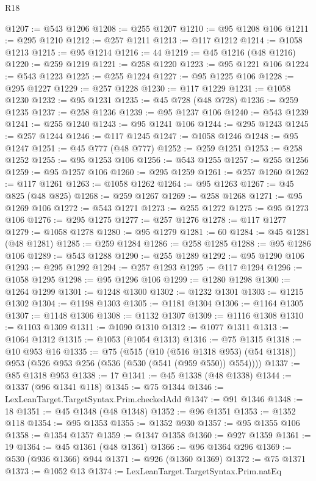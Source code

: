 \begin{lexlean}{R18}
\begin{coremodule}
@1207 := @543 @1206
@1208 := @255 @1207
@1210 := @95 @1208 @106
@1211 := @295 @1210
@1212 := @257 @1211
@1213 := @117 @1212
@1214 := @1058 @1213
@1215 := @95 @1214
@1216 := 44
@1219 := @45 @1216 (@48 @1216)
@1220 := @259 @1219
@1221 := @258 @1220
@1223 := @95 @1221 @106
@1224 := @543 @1223
@1225 := @255 @1224
@1227 := @95 @1225 @106
@1228 := @295 @1227
@1229 := @257 @1228
@1230 := @117 @1229
@1231 := @1058 @1230
@1232 := @95 @1231
@1235 := @45 @728 (@48 @728)
@1236 := @259 @1235
@1237 := @258 @1236
@1239 := @95 @1237 @106
@1240 := @543 @1239
@1241 := @255 @1240
@1243 := @95 @1241 @106
@1244 := @295 @1243
@1245 := @257 @1244
@1246 := @117 @1245
@1247 := @1058 @1246
@1248 := @95 @1247
@1251 := @45 @777 (@48 @777)
@1252 := @259 @1251
@1253 := @258 @1252
@1255 := @95 @1253 @106
@1256 := @543 @1255
@1257 := @255 @1256
@1259 := @95 @1257 @106
@1260 := @295 @1259
@1261 := @257 @1260
@1262 := @117 @1261
@1263 := @1058 @1262
@1264 := @95 @1263
@1267 := @45 @825 (@48 @825)
@1268 := @259 @1267
@1269 := @258 @1268
@1271 := @95 @1269 @106
@1272 := @543 @1271
@1273 := @255 @1272
@1275 := @95 @1273 @106
@1276 := @295 @1275
@1277 := @257 @1276
@1278 := @117 @1277
@1279 := @1058 @1278
@1280 := @95 @1279
@1281 := 60
@1284 := @45 @1281 (@48 @1281)
@1285 := @259 @1284
@1286 := @258 @1285
@1288 := @95 @1286 @106
@1289 := @543 @1288
@1290 := @255 @1289
@1292 := @95 @1290 @106
@1293 := @295 @1292
@1294 := @257 @1293
@1295 := @117 @1294
@1296 := @1058 @1295
@1298 := @95 @1296 @106
@1299 := @1280 @1298
@1300 := @1264 @1299
@1301 := @1248 @1300
@1302 := @1232 @1301
@1303 := @1215 @1302
@1304 := @1198 @1303
@1305 := @1181 @1304
@1306 := @1164 @1305
@1307 := @1148 @1306
@1308 := @1132 @1307
@1309 := @1116 @1308
@1310 := @1103 @1309
@1311 := @1090 @1310
@1312 := @1077 @1311
@1313 := @1064 @1312
@1315 := @1053 (@1054 @1313)
@1316 := @75 @1315
@1318 := @10 @953 @16
@1335 := @75
    (@515
      (@10 (@516 @1318 @953) (@54 @1318))
      @953
      (@526 @953 @256 (@536 (@530 (@541 (@959 @550)) @554))))
@1337 := @85 @1318 @953
@1338 := 17
@1341 := @45 @1338 (@48 @1338)
@1344 := @1337 (@96 @1341 @118)
@1345 := @75 @1344
@1346 := LexLeanTarget.TargetSyntax.Prim.checkedAdd
@1347 := @91 @1346
@1348 := 18
@1351 := @45 @1348 (@48 @1348)
@1352 := @96 @1351
@1353 := @1352 @118
@1354 := @95 @1353
@1355 := @1352 @930
@1357 := @95 @1355 @106
@1358 := @1354 @1357
@1359 := @1347 @1358
@1360 := @927 @1359
@1361 := 19
@1364 := @45 @1361 (@48 @1361)
@1366 := @96 @1364 @296
@1369 := @530 (@936 @1366) @944
@1371 := @926 (@1360 @1369)
@1372 := @75 @1371
@1373 := @1052 @13
@1374 := LexLeanTarget.TargetSyntax.Prim.natEq

\end{coremodule}
\end{lexlean}
